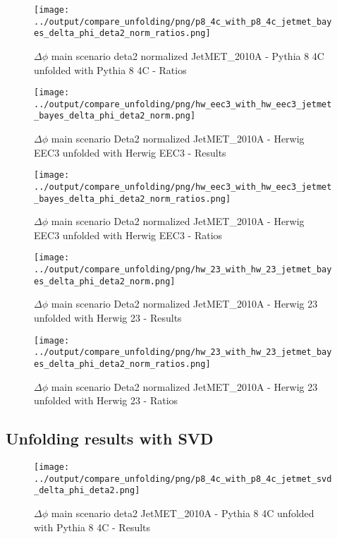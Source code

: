 \documentclass[11pt]{book}
\begin{document}
\begin{figure}[ht]
\centering
\texttt{[image: ../output/compare\_unfolding/png/p8\_4c\_with\_p8\_4c\_jetmet\_bayes\_delta\_phi\_deta2\_norm\_ratios.png]}
\caption{$\Delta\phi$ main scenario deta2 normalized JetMET\_2010A - Pythia 8 4C unfolded with Pythia 8 4C - Ratios}
\label{p8_p8_jetmet_bayes_delta_phi_deta2_norm_b}
\end{figure}

\begin{figure}[ht]
\centering
\texttt{[image: ../output/compare\_unfolding/png/hw\_eec3\_with\_hw\_eec3\_jetmet\_bayes\_delta\_phi\_deta2\_norm.png]}
\caption{$\Delta\phi$ main scenario Deta2 normalized JetMET\_2010A - Herwig EEC3 unfolded with Herwig EEC3 - Results}
\label{hw_eec3_hw_eec3_jetmet_bayes_delta_phi_deta2_norm_a}
\end{figure}

\begin{figure}[ht]
\centering
\texttt{[image: ../output/compare\_unfolding/png/hw\_eec3\_with\_hw\_eec3\_jetmet\_bayes\_delta\_phi\_deta2\_norm\_ratios.png]}
\caption{$\Delta\phi$ main scenario Deta2 normalized JetMET\_2010A - Herwig EEC3 unfolded with Herwig EEC3 - Ratios}
\label{hw_eec3_hw_eec3_jetmet_bayes_delta_phi_deta2_norm_b}
\end{figure}

\begin{figure}[ht]
\centering
\texttt{[image: ../output/compare\_unfolding/png/hw\_23\_with\_hw\_23\_jetmet\_bayes\_delta\_phi\_deta2\_norm.png]}
\caption{$\Delta\phi$ main scenario Deta2 normalized JetMET\_2010A - Herwig 23 unfolded with Herwig 23 - Results}
\label{hw_23_hw_23_jetmet_bayes_delta_phi_deta2_norm_a}
\end{figure}

\begin{figure}[ht]
\centering
\texttt{[image: ../output/compare\_unfolding/png/hw\_23\_with\_hw\_23\_jetmet\_bayes\_delta\_phi\_deta2\_norm\_ratios.png]}
\caption{$\Delta\phi$ main scenario Deta2 normalized JetMET\_2010A - Herwig 23 unfolded with Herwig 23 - Ratios}
\label{hw_23_hw_23_jetmet_bayes_delta_phi_deta2_norm_b}
\end{figure}


\clearpage
\subsection{Unfolding results with SVD}

\begin{figure}[ht]
\centering
\texttt{[image: ../output/compare\_unfolding/png/p8\_4c\_with\_p8\_4c\_jetmet\_svd\_delta\_phi\_deta2.png]}
\caption{$\Delta\phi$ main scenario deta2 JetMET\_2010A - Pythia 8 4C unfolded with Pythia 8 4C - Results}
\label{p8_p8_jetmet_svd_delta_phi_deta2_a}
\end{figure}
\end{document}
